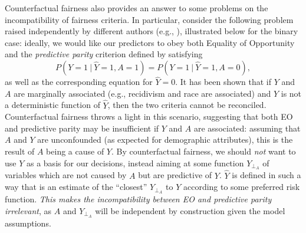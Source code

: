 Counterfactual fairness also provides an answer to some problems on
the incompatibility of fairness criteria. In particular, consider the
following problem raised independently by different authors (e.g.,
\cite{chouldechova:17, kleinberg:17}), illustrated below for the
binary case: ideally, we would like our predictors to obey both
Equality of Opportunity and the {\it predictive parity} criterion
defined by satisfying
\[
P(Y = 1\ |\ \hat Y = 1, A = 1) = P(Y = 1\ |\ \hat Y = 1, A = 0),
\]
\noindent as well as the corresponding equation for $\hat Y = 0$. It
has been shown that if $Y$ and $A$ are marginally associated (e.g.,
recidivism and race are associated) and $Y$ is not a deterministic
function of $\hat Y$, then the two criteria cannot be
reconciled. Counterfactual fairness throws a light in this scenario,
suggesting that both EO and predictive parity may be insufficient if
$Y$ and $A$ are associated: assuming that $A$ and $Y$ are unconfounded (as
expected for demographic attributes), this is the result of $A$ being
a cause of $Y$. By counterfactual fairness, we should {\it not} want
to use $Y$ as a basis for our decisions, instead aiming at some function
$Y_{\perp_A}$ of variables which are not caused by $A$ but are
predictive of $Y$. $\hat Y$ is defined in such a way that is an
estimate of the ``closest'' $Y_{\perp_A}$ to $Y$ according to some
preferred risk function. {\it This makes the incompatibility between EO and
  predictive parity irrelevant}, as $A$ and $Y_{\perp_A}$ will be
independent by construction given the model assumptions.



